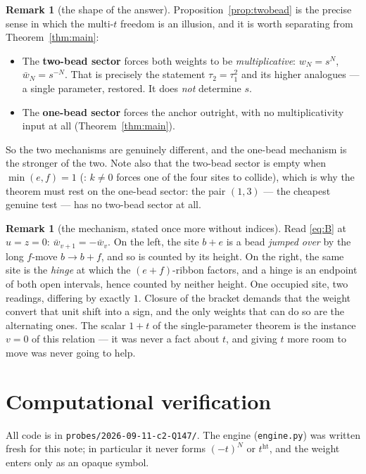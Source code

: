 \documentclass[11pt]{article}
\theoremstyle{definition}
\newtheorem{remark}[theorem]{Remark}
\newcommand{\hgt}{\operatorname{ht}}   %
\begin{document}
\begin{remark}[the shape of the answer]\label{rem:shape}
Proposition~\ref{prop:twobead} is the precise sense in which the multi-$t$ freedom is an
illusion, and it is worth separating from Theorem~\ref{thm:main}:
\begin{itemize}
\item The \textbf{two-bead sector} forces both weights to be \emph{multiplicative}:
      $w_N=s^N$, $\bar w_N=s^{-N}$.  That is precisely the statement
      $\tau_2=\tau_1^{2}$ and its higher analogues --- a single parameter, restored.  It
      does \emph{not} determine $s$.
\item The \textbf{one-bead sector} forces the anchor outright, with no multiplicativity
      input at all (Theorem~\ref{thm:main}).
\end{itemize}
So the two mechanisms are genuinely different, and the one-bead mechanism is the stronger
of the two.  Note also that the two-bead sector is empty when $\min(e,f)=1$
(\cite[Cor.~9]{Clio0907}: $k\ne0$ forces one of the four sites to collide), which is why
the theorem must rest on the one-bead sector: the pair $(1,3)$ --- the cheapest genuine
test --- has no two-bead sector at all.
\end{remark}

\begin{remark}[the mechanism, stated once more without indices]\label{rem:why}
Read \eqref{eq:B} at $u=z=0$: $\bar w_{v+1}=-\bar w_v$.  On the left, the site $b+e$ is a
bead \emph{jumped over} by the long $f$-move $b\to b+f$, and so is counted by its height.
On the right, the same site is the \emph{hinge} at which the $(e+f)$-ribbon factors, and
a hinge is an endpoint of both open intervals, hence counted by neither height.  One
occupied site, two readings, differing by exactly $1$.  Closure of the bracket demands
that the weight convert that unit shift into a sign, and the only weights that can do so
are the alternating ones.  The scalar $1+t$ of the single-parameter theorem is the
instance $v=0$ of this relation --- it was never a fact about $t$, and giving $t$ more
room to move was never going to help.
\end{remark}

\section{Computational verification}\label{sec:ver}

All code is in \texttt{probes/2026-09-11-c2-Q147/}.  The engine
(\texttt{engine.py}) was written fresh for this note; in particular it never forms
$(-t)^N$ or $t^{\hgt}$, and the weight enters only as an opaque symbol.
\end{document}
